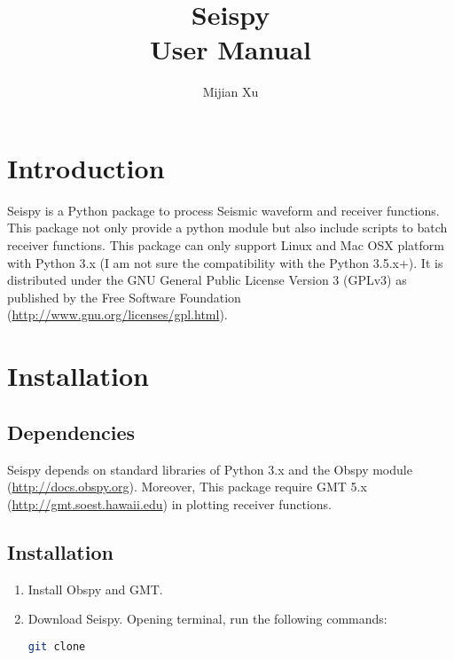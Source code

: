 \documentclass[12pt, a4paper]{report}
\title{Seispy\\User Manual}
\author[1,*]{Mijian Xu}
\affil[1]{\small School of Earth Science and Engineering, Nanjing University}
\affil[*]{\small Email: gomijianxu@gmail.com}
\begin{document}
\maketitle
\tableofcontents

\chapter{Introduction}
Seispy is a Python package to process Seismic waveform and receiver functions. This package not only provide a python module but also include scripts to batch receiver functions. This package can only support Linux and Mac OSX platform with Python 3.x (I am not sure the compatibility with the Python 3.5.x+). It is distributed under the GNU General Public License Version 3 (GPLv3) as published by the Free Software Foundation (\url{http://www.gnu.org/licenses/gpl.html}).

\chapter{Installation}

\section{Dependencies}
Seispy depends on standard libraries of Python 3.x and the Obspy module (\url{http://docs.obspy.org}). Moreover, This package require GMT 5.x (\url{http://gmt.soest.hawaii.edu}) in plotting receiver functions.

\section{Installation}
\begin{enumerate}
\item Install Obspy and GMT.
\item Download Seispy. Opening terminal, run the following commands:
\begin{lstlisting}[language=bash]
git clone 
\end{lstlisting}

\end{enumerate}
\end{document}
